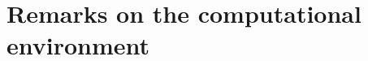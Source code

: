 \documentclass{mtmtcl}
\theoremstyle{plain}
\theoremstyle{remark}
\begin{document}
%     
%     
%     
%     
%     
%     
%     
%     
%     
%     
%     
%     


\section{Remarks on the computational environment}
\end{document}
